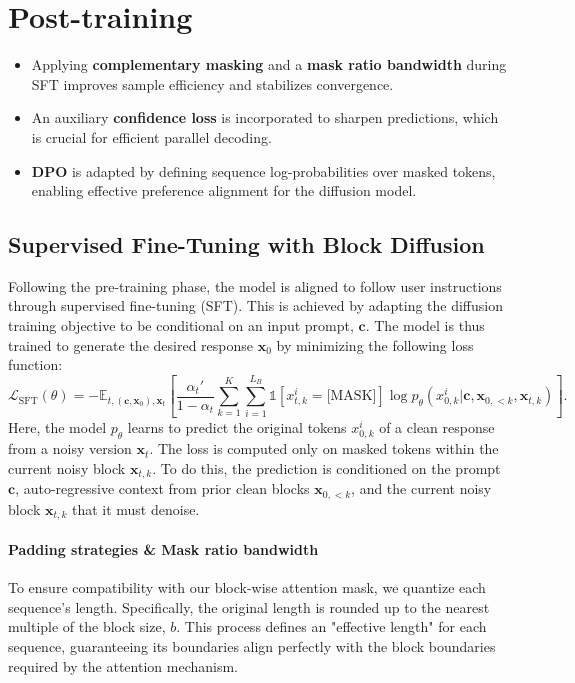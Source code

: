 \section{Post-training}

\begin{takeaway}[title={Takeaway}]
\begin{itemize}[leftmargin=2em]
\item[(1)] Applying \textbf{complementary masking} and a \textbf{mask ratio bandwidth} during SFT improves sample efficiency and stabilizes convergence.
\item[(2)] An auxiliary \textbf{confidence loss} is incorporated to sharpen predictions, which is crucial for efficient parallel decoding.
\item[(3)] \textbf{DPO} is adapted by defining sequence log-probabilities over masked tokens, enabling effective preference alignment for the diffusion model.
\end{itemize}
\end{takeaway}

\subsection{Supervised Fine-Tuning with Block Diffusion}

Following the pre-training phase, the model is aligned to follow user instructions through supervised fine-tuning (SFT). This is achieved by adapting the diffusion training objective to be conditional on an input prompt, $\bm{c}$. The model is thus trained to generate the desired response $\bm{x}_0$ by minimizing the following loss function:
\begin{equation}\label{eq:sft_loss}
    \mathcal{L}_{\text{SFT}}(\theta) = - \mathbb{E}_{t,(\bm{c},\bm{x}_0),\bm{x}_t} \left[\frac{\alpha_{t}'}{1-\alpha_{t}}\sum^{K}_{k=1}\sum_{i=1}^{L_{B}}\mathbb{1}[x_{t,k}^i=\text{[MASK]}]\log p_{\theta}(x^i_{0,k} |\bm{c}, \bm{x}_{0,<k}, \bm{x}_{t,k})\right].
\end{equation}
Here, the model $p_{\theta}$ learns to predict the original tokens $x^i_{0,k}$ of a clean response from a noisy version $\bm{x}_t$. The loss is computed only on masked tokens within the current noisy block $\bm{x}_{t,k}$. To do this, the prediction is conditioned on the prompt $\bm{c}$, auto-regressive context from prior clean blocks $\bm{x}_{0,<k}$, and the current noisy block $\bm{x}_{t,k}$ that it must denoise.

\paragraph{Padding strategies \& Mask ratio bandwidth}
To ensure compatibility with our block-wise attention mask, we quantize each sequence's length. Specifically, the original length is rounded up to the nearest multiple of the block size, $b$. This process defines an "effective length" for each sequence, guaranteeing its boundaries align perfectly with the block boundaries required by the attention mechanism.


